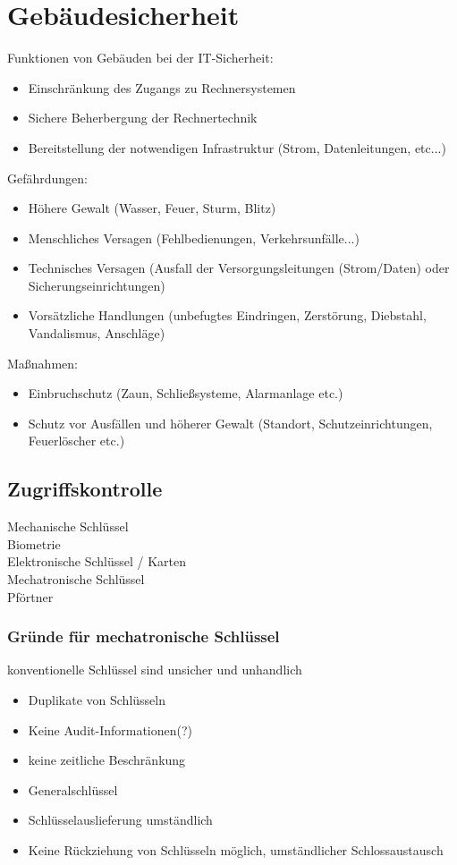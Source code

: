 \documentclass{article} %
\begin{document}
\section{Gebäudesicherheit}
Funktionen von Gebäuden bei der IT-Sicherheit:
\begin{itemize}
	\item Einschränkung des Zugangs zu Rechnersystemen
    \item Sichere Beherbergung der Rechnertechnik
    \item Bereitstellung der notwendigen Infrastruktur (Strom, Datenleitungen, etc...)
\end{itemize}
Gefährdungen:
\begin{itemize}
	\item Höhere Gewalt (Wasser, Feuer, Sturm, Blitz)
    \item Menschliches Versagen (Fehlbedienungen, Verkehrsunfälle...)
    \item Technisches Versagen (Ausfall der Versorgungsleitungen (Strom/Daten) oder Sicherungseinrichtungen)
    \item Vorsätzliche Handlungen (unbefugtes Eindringen, Zerstörung, Diebstahl, Vandalismus, Anschläge)
\end{itemize}
Maßnahmen:
\begin{itemize}
	\item Einbruchschutz (Zaun, Schließsysteme, Alarmanlage etc.)
    \item Schutz vor Ausfällen und höherer Gewalt (Standort, Schutzeinrichtungen, Feuerlöscher etc.)
\end{itemize}
\subsection{Zugriffskontrolle}
Mechanische Schlüssel\\
Biometrie\\
Elektronische Schlüssel / Karten\\
Mechatronische Schlüssel\\
Pförtner
\subsubsection{Gründe für mechatronische Schlüssel}
konventionelle Schlüssel sind unsicher und unhandlich
\begin{itemize}
	\item Duplikate von Schlüsseln
    \item Keine Audit-Informationen(?)
    \item keine zeitliche Beschränkung
    \item Generalschlüssel
    \item Schlüsselauslieferung umständlich
    \item Keine Rückziehung von Schlüsseln möglich, umständlicher Schlossaustausch
\end{itemize}
\end{document}
